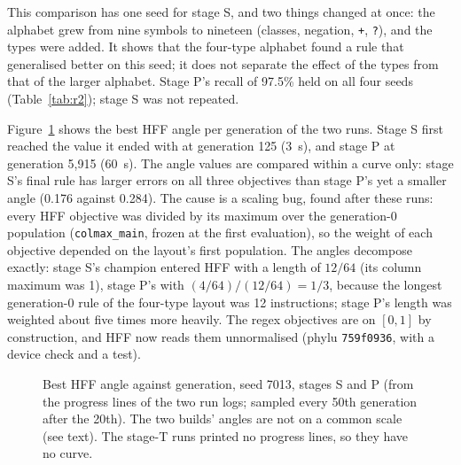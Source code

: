 \documentclass[sigconf,nonacm]{acmart}
\newcommand{\rx}{\lstinline[style=mono]}
\begin{document}
This comparison has one seed for stage S, and two things changed at once: the
alphabet grew from nine symbols to nineteen (classes, negation, \rx!+!, \rx!?!),
and the types were added. It shows that the four-type alphabet found a rule that
generalised better on this seed; it does not separate the effect of the types
from that of the larger alphabet. Stage P's recall of 97.5\% held on all four
seeds (Table~\ref{tab:r2}); stage S was not repeated.

Figure~\ref{fig:curves} shows the best HFF angle per generation of the two runs.
Stage S first reached the value it ended with at generation 125 (3~s), and
stage P at generation 5{,}915 (60~s). The angle values are compared within
a curve only: stage S's final rule has larger errors on all three objectives
than stage P's yet a smaller angle (0.176 against 0.284). The cause is a scaling
bug, found after these runs: every HFF objective was divided by its maximum over
the generation-0 population (\texttt{colmax\_main}, frozen at the first
evaluation), so the weight of each objective depended on the layout's first
population. The angles decompose exactly: stage S's champion entered HFF with a
length of $12/64$ (its column maximum was 1), stage P's with
$(4/64)/(12/64)=1/3$, because the longest generation-0 rule of the four-type
layout was 12 instructions; stage P's length was weighted about five times more
heavily. The regex objectives are on $[0,1]$ by construction, and HFF now reads
them unnormalised (phylu \texttt{759f0936}, with a device check and a test).

\begin{figure}[t]
\centering
{}
\caption{Best HFF angle against generation, seed 7013, stages S and P (from the
progress lines of the two run logs; sampled every 50th generation after the
20th). The two builds' angles are not on a common scale (see text). The stage-T
runs printed no progress lines, so they have no curve.}
\label{fig:curves}
\end{figure}
\end{document}
